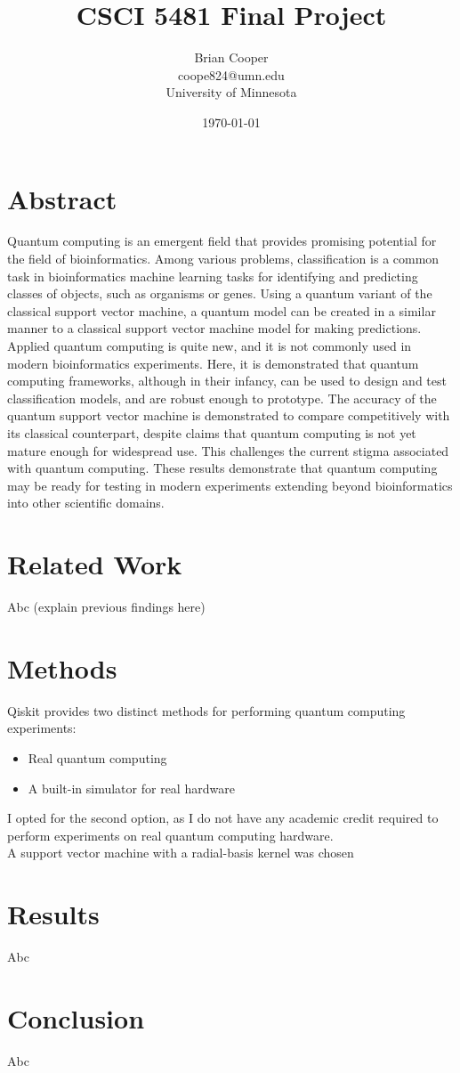 \documentclass{article}
\title{CSCI 5481 Final Project}
\author{Brian Cooper \\ coope824@umn.edu \\ University of Minnesota}
\date{\today}
\begin{document}
\maketitle

\section{Abstract}
  Quantum computing is an emergent field that provides promising potential for the field of bioinformatics. Among various problems, classification is a common task in bioinformatics machine learning tasks for identifying and predicting classes of objects, such as organisms or genes. Using a quantum variant of the classical support vector machine, a quantum model can be created in a similar manner to a classical support vector machine model for making predictions. Applied quantum computing is quite new, and it is not commonly used in modern bioinformatics experiments. Here, it is demonstrated that quantum computing frameworks, although in their infancy, can be used to design and test classification models, and are robust enough to prototype. The accuracy of the quantum support vector machine is demonstrated to compare competitively with its classical counterpart, despite claims that quantum computing is not yet mature enough for widespread use. This challenges the current stigma associated with quantum computing. These results demonstrate that quantum computing may be ready for testing in modern experiments extending beyond bioinformatics into other scientific domains.

\section{Related Work}
  Abc (explain previous findings here)

\section{Methods}
  Qiskit provides two distinct methods for performing quantum computing experiments:

  \begin{itemize}
    \item{Real quantum computing}
    \item{A built-in simulator for real hardware}
  \end{itemize}

  I opted for the second option, as I do not have any academic credit required to perform experiments on real quantum computing hardware. \\

  A support vector machine with a radial-basis kernel was chosen

\section{Results}
  Abc

\section{Conclusion}
  Abc
\end{document}
